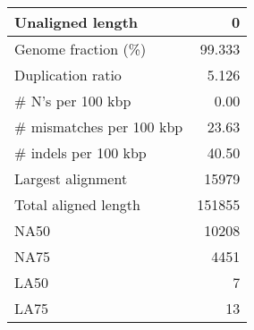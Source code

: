 \documentclass[12pt,a4paper]{article}
\begin{document}
\begin{table}[ht]
\begin{center}
\begin{tabular}{|l*{1}{|r}|}
Unaligned length & 0 \\ \hline
Genome fraction (\%) & 99.333 \\ \hline
Duplication ratio & 5.126 \\ \hline
\# N's per 100 kbp & 0.00 \\ \hline
\# mismatches per 100 kbp & 23.63 \\ \hline
\# indels per 100 kbp & 40.50 \\ \hline
Largest alignment & 15979 \\ \hline
Total aligned length & 151855 \\ \hline
NA50 & 10208 \\ \hline
NA75 & 4451 \\ \hline
LA50 & 7 \\ \hline
LA75 & 13 \\ \hline
\end{tabular}
\end{center}
\end{table}
\end{document}

